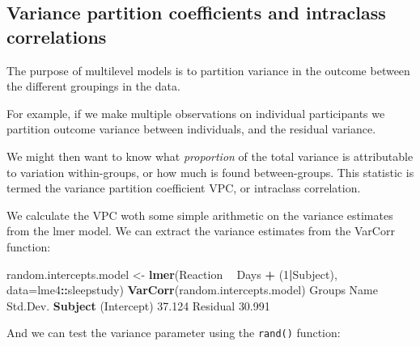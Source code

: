 \documentclass[]{article}
\newenvironment{Shaded}{\begin{snugshade}}{\end{snugshade}}
\newcommand{\DataTypeTok}[1]{\textcolor[rgb]{0.13,0.29,0.53}{#1}}
\newcommand{\DecValTok}[1]{\textcolor[rgb]{0.00,0.00,0.81}{#1}}
\newcommand{\FloatTok}[1]{\textcolor[rgb]{0.00,0.00,0.81}{#1}}
\newcommand{\KeywordTok}[1]{\textcolor[rgb]{0.13,0.29,0.53}{\textbf{#1}}}
\newcommand{\NormalTok}[1]{#1}
\newcommand{\OperatorTok}[1]{\textcolor[rgb]{0.81,0.36,0.00}{\textbf{#1}}}
\newcommand{\StringTok}[1]{\textcolor[rgb]{0.31,0.60,0.02}{#1}}
\begin{document}
\hypertarget{icc-and-vpc}{%
\subsection*{Variance partition coefficients and intraclass correlations}\label{icc-and-vpc}}

The purpose of multilevel models is to partition variance in the outcome between
the different groupings in the data.

For example, if we make multiple observations on individual participants we
partition outcome variance between individuals, and the residual variance.

We might then want to know what \emph{proportion} of the total variance is
attributable to variation within-groups, or how much is found between-groups.
This statistic is termed the variance partition coefficient VPC, or intraclass
correlation.

We calculate the VPC woth some simple arithmetic on the variance estimates from
the lmer model. We can extract the variance estimates from the VarCorr function:

\begin{Shaded}
\begin{Highlighting}[]
\NormalTok{random.intercepts.model <-}\StringTok{ }\KeywordTok{lmer}\NormalTok{(Reaction }\OperatorTok{~}\StringTok{ }\NormalTok{Days }\OperatorTok{+}\StringTok{ }\NormalTok{(}\DecValTok{1}\OperatorTok{|}\NormalTok{Subject),  }\DataTypeTok{data=}\NormalTok{lme4}\OperatorTok{::}\NormalTok{sleepstudy)}
\KeywordTok{VarCorr}\NormalTok{(random.intercepts.model)}
\NormalTok{ Groups   Name        Std.Dev.}
 \KeywordTok{Subject}\NormalTok{  (Intercept) }\FloatTok{37.124}  
\NormalTok{ Residual             }\FloatTok{30.991}  
\end{Highlighting}
\end{Shaded}

And we can test the variance parameter using the \texttt{rand()} function:
\end{document}
